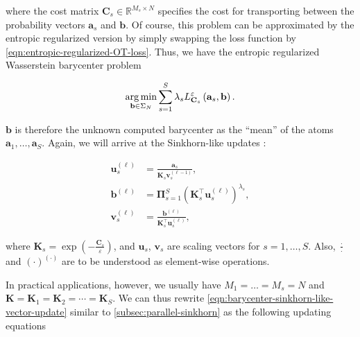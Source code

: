 where the cost matrix $\mathbf{C}_s \in \mathbb{R}^{M_s \times N}$ specifies the cost for transporting
between the probability vectors $\mathbf{a}_s$ and $\mathbf{b}$.
Of course, this problem can be approximated by the entropic regularized version
by simply swapping the loss function by \cref{eqn:entropic-regularized-OT-loss}.
Thus, we have the entropic regularized Wasserstein barycenter problem

\begin{equation}
  \begin{aligned}
    \operatorname*{arg\,min}_{\mathbf{b} \in \Sigma_N} \sum_{s=1}^S \lambda_s L_{\mathbf{C}_s}^\varepsilon \left(\mathbf{a}_s, \mathbf{b}\right).
  \end{aligned}
\end{equation}

$\mathbf{b}$ is therefore the unknown computed barycenter as the ``mean'' of
the atoms $\mathbf{a}_1, \ldots, \mathbf{a}_S$.
Again, we will arrive at the Sinkhorn-like updates \citep{benamou2015,schmitz2018}:

\begin{equation}\label{eqn:barycenter-sinkhorn-like-vector-update}
  \begin{aligned}
    \mathbf{u}_s^{(\ell)}
     & = \frac{\mathbf{a}_s}{\mathbf{K}_s \mathbf{v}_s^{(\ell-1)}},                                   \\
    \mathbf{b}^{(\ell)}
     & = \boldsymbol{\Pi}_{s = 1}^S \left(\mathbf{K}_s^\top \mathbf{u}_s^{(\ell)}\right)^{\lambda_s}, \\
    \mathbf{v}_s^{(\ell)}
     & = \frac{\mathbf{b}^{(\ell)}}{\mathbf{K}_s^\top \mathbf{u}_s^{(\ell)}},
  \end{aligned}
\end{equation}

where $\mathbf{K}_s = \exp \left(-\frac{\mathbf{C}_s}{\varepsilon}\right)$,
and $\mathbf{u}_s$, $\mathbf{v}_s$ are scaling vectors for $s = 1, \ldots, S$.
Also, $\frac\cdot\cdot$ and $\left(\cdot\right)^{(\cdot)}$ are to be understood as element-wise operations.

In practical applications, however,
we usually have $M_1 = \ldots = M_s = N$
and $\mathbf{K} = \mathbf{K}_1 = \mathbf{K}_2 = \cdots = \mathbf{K}_S$.
We can thus rewrite \cref{eqn:barycenter-sinkhorn-like-vector-update}
similar to \cref{subsec:parallel-sinkhorn} as the following updating equations

